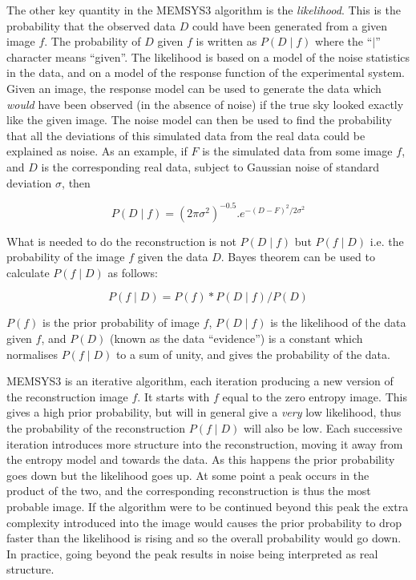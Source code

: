 The other key quantity in the MEMSYS3 algorithm is the {\em likelihood}. This
is  the probability that the observed data $D$ could have been generated from a 
given image $f$. The probability of $D$ given $f$  is written as $P( D \mid f
)$ where the ``$\mid$'' character means ``given''. The likelihood is based on a 
model of the noise statistics in the data, and on a model of the response 
function of the experimental system. Given an image, the response model can be 
used to generate the data which {\em would} have been observed (in the absence 
of noise) if the true sky looked exactly like the given image. The noise model 
can then be used to find the probability that all the deviations of  this
simulated data from the real data could be explained as noise. As an  example,
if $F$ is the simulated data from some image $f$, and $D$ is the  corresponding
real data, subject to Gaussian noise of standard deviation  $\sigma$, then 

\begin{equation}
P(D \mid f) = (2\pi\sigma^{2})^{-0.5}.e^{-(D-F)^{2}/2\sigma^{2}}
\end{equation}

What is needed to do the reconstruction is not $P( D \mid f)$ but 
$P( f \mid D)$ i.e. the probability of the image $f$ given the data $D$. 
Bayes theorem can be used to calculate $P( f \mid D )$ as follows:

\begin{equation}
P(f \mid D) = P(f)*P(D \mid f)/P(D) \label{EQ:BAYES}
\end{equation}

$P(f)$ is the prior probability of image $f$, $P( D \mid f )$ is the likelihood
of  the data given $f$, and $P(D)$ (known as the data ``evidence'') is a
constant  which normalises $P( f \mid D )$ to a sum of unity, and gives the
probability of  the data.

MEMSYS3 is an iterative algorithm, each iteration producing a new version of 
the reconstruction image $f$. It starts with $f$ equal to the zero entropy
image.  This gives a high prior probability, but will in general give a {\em
very} low likelihood, thus the probability of the reconstruction $P(f \mid D)$
will  also be low. Each successive iteration introduces more structure into the 
reconstruction, moving it away from the entropy model and towards the data. As 
this happens the prior probability goes down but the likelihood goes up. At
some  point a peak occurs in the product of the two, and the corresponding 
reconstruction is thus the most probable image. If the algorithm were to be 
continued beyond this peak the extra complexity introduced into the image would
causes the  prior probability to drop faster than the likelihood is rising and
so the overall  probability would go down. In practice, going beyond the peak
results in noise  being interpreted as real structure.

